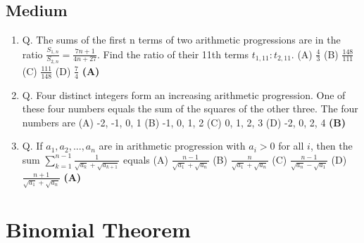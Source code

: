 \documentclass{article}
\begin{document}
\subsection{Medium}
\begin{enumerate}
\item Q. The sums of the first n terms of two arithmetic progressions are in the ratio $\frac{S_{1,n}}{S_{2,n}} = \frac{7n+1}{4n+27}$. Find the ratio of their 11th terms $t_{1,11} : t_{2,11}$.
(A) $\frac{4}{3}$
(B) $\frac{148}{111}$
(C) $\frac{111}{148}$
(D) $\frac{7}{4}$ \hfill \textbf{(A)}
\item Q. Four distinct integers form an increasing arithmetic progression. One of these four numbers equals the sum of the squares of the other three. The four numbers are
(A) -2, -1, 0, 1
(B) -1, 0, 1, 2
(C) 0, 1, 2, 3
(D) -2, 0, 2, 4 \hfill \textbf{(B)}
\item Q. If $a_1, a_2, ..., a_n$ are in arithmetic progression with $a_i > 0$ for all $i$, then the sum
$\sum_{k=1}^{n-1} \frac{1}{\sqrt{a_k} + \sqrt{a_{k+1}}}$ equals
(A) $\frac{n-1}{\sqrt{a_1}+\sqrt{a_n}}$
(B) $\frac{n}{\sqrt{a_1}+\sqrt{a_n}}$
(C) $\frac{n-1}{\sqrt{a_n} - \sqrt{a_1}}$
(D) $\frac{n+1}{\sqrt{a_1} + \sqrt{a_n}}$ \hfill \textbf{(A)}
\end{enumerate}
\section{Binomial Theorem}
\end{document}
